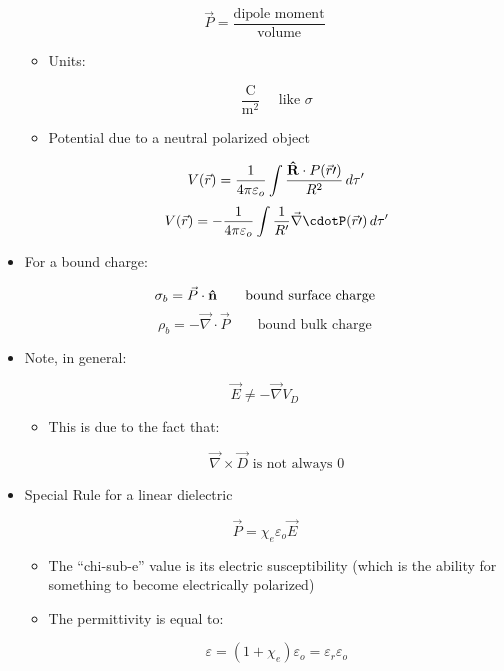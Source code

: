 \begin{itemize}
    $$\vec{P}=\frac{\text{dipole moment}}{\text{volume}}$$

    \begin{itemize}

      \item Units:

        $$\frac{\si{\coulomb}}{\si{\meter\squared}}\quad\text{ like }\sigma$$

      \item Potential due to a neutral polarized object

        $$V(\vec{r})=\frac{1}{4\pi\varepsilon_o}\int\frac{\bold{\hat{R}}\cdot P(\vec{r}\prime)}{R^2}\,d\tau'$$
        $$V(\vec{r})=-\frac{1}{4\pi\varepsilon_o}\int\frac{1}{R'}\vec{\nabla}\cdotP(\vec{r}\prime)\,d\tau'$$

    \end{itemize}

  \item For a bound charge:

    $$\sigma_b=\vec{P}\cdot\bold{\hat{n}}\quad\quad\text{bound surface charge}$$
    $$\rho_b=-\vec{\nabla}\cdot\vec{P}\quad\quad\text{bound bulk charge}$$

  \item Note, in general:

    $$\vec{E}\neq -\vec{\nabla}V_D$$

    \begin{itemize}

      \item This is due to the fact that:

        $$\vec{\nabla}\times\vec{D}\text{ is not always 0}$$

    \end{itemize}

  \item Special Rule for a linear dielectric

    $$\vec{P}=\chi_e\varepsilon_o\vec{E}$$

    \begin{itemize}

      \item The ``chi-sub-e'' value is its electric susceptibility (which is the ability for something to become electrically polarized)

      \item The permittivity is equal to:

        $$\varepsilon=(1+\chi_e)\varepsilon_o=\varepsilon_r\varepsilon_o$$


\end{itemize}
\end{itemize}
